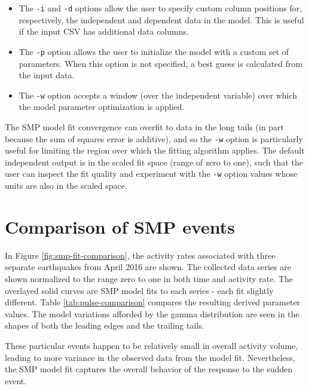 \documentclass{article}
\begin{document}
\begin{itemize}  
\item The \texttt{-i} and \texttt{-d} options allow the user to specify custom column positions for, respectively, the independent and dependent data in the model. This is useful if the input CSV has additional data columns. 
\item The \texttt{-p} option allows the user to initialize the model with a custom set of parameters. When this option is not specified, a best guess is calculated from the input data. 
\item The \texttt{-w} option accepts a window (over the independent variable) over which the model parameter optimization is applied.
\end{itemize}

The SMP model fit convergence can overfit to data in the long tails (in part because the sum of squares error is additive), and so the \texttt{-w} option is particularly useful for limiting the region over which the fitting algorithm applies. The default independent output is in the scaled fit space (range of zero to one), such that the user can inspect the fit quality and experiment with the \texttt{-w} option values whose units are also in the scaled space. 

 


\section{Comparison of SMP events}
\label{sec:pulse-comparison}

In Figure \ref{fig:smp-fit-comparison}, the activity rates associated with three separate earthquakes from April 2016 are shown. The collected data series are shown normalized to the range zero to one in both time and activity rate. The overlayed solid curves are SMP model fits to each series - each fit slightly different. Table \ref{tab:pulse-comparison} compares the resulting derived parameter values. The model variations afforded by the gamma distribution are seen in the shapes of both the leading edges and the trailing tails.  

These particular events happen to be relatively small in overall activity volume, leading to more variance in the observed data from the model fit. Nevertheless, the SMP model fit captures the overall behavior of the response to the sudden event. 
\end{document}
